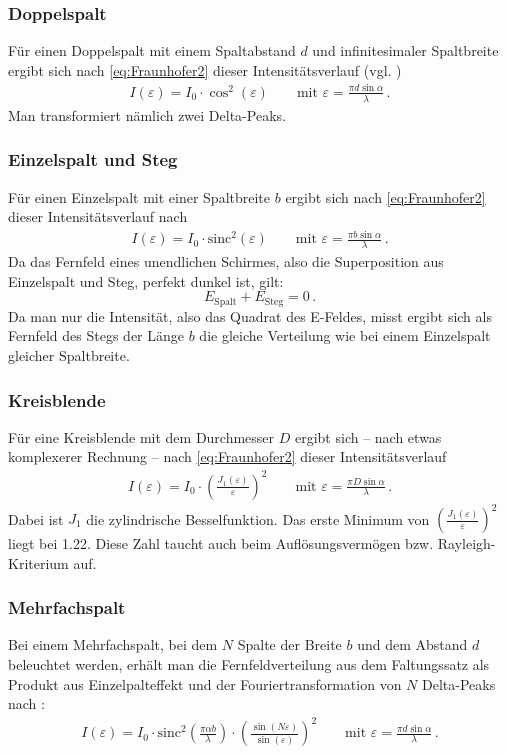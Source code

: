 \documentclass[12pt,a4paper,titlepage,headinclude,bibtotoc]{scrartcl}
\newcommand{\sinc}{\ensuremath{\mathrm{sinc}}}
\begin{document}
\subsubsection{Doppelspalt}
Für einen Doppelspalt mit einem Spaltabstand $d$ und infinitesimaler Spaltbreite ergibt sich nach \eqref{eq:Fraunhofer2} dieser Intensitätsverlauf (vgl. \cite[S.457ff.]{hecht})
\begin{align}
	I(\varepsilon)=I_0 \cdot \cos^2(\varepsilon) \qquad \text{mit }\varepsilon= \frac{\pi d \sin \alpha}{\lambda}\,.
\end{align}
Man transformiert nämlich zwei Delta-Peaks.

\subsubsection{Einzelspalt und Steg}
Für einen Einzelspalt mit einer Spaltbreite $b$ ergibt sich nach \eqref{eq:Fraunhofer2} dieser Intensitätsverlauf nach \cite[S.452]{hecht}
\begin{align}
	I(\varepsilon)=I_0 \cdot \sinc^2(\varepsilon)\qquad \text{mit }\varepsilon= \frac{\pi b \sin \alpha}{\lambda}\,.
\end{align}
Da das Fernfeld eines unendlichen Schirmes, also die Superposition aus Einzelspalt und Steg, perfekt dunkel ist, gilt:
$$ E_\text{Spalt} + E_\text{Steg} = 0 \,.$$
Da man nur die Intensität, also das Quadrat des E-Feldes, misst ergibt sich als Fernfeld des Stegs der Länge $b$ die gleiche Verteilung wie bei einem Einzelspalt gleicher Spaltbreite.

\subsubsection{Kreisblende}
Für eine Kreisblende mit dem Durchmesser $D$ ergibt sich -- nach etwas komplexerer Rechnung \cite[S.467ff.]{hecht} -- nach \eqref{eq:Fraunhofer2} dieser Intensitätsverlauf
\begin{align}
	I(\varepsilon)=I_0 \cdot \left(\frac{J_1(\varepsilon)}{\varepsilon}\right)^2 \qquad \text{mit }\varepsilon= \frac{\pi D \sin \alpha}{\lambda}\,.
\end{align}
Dabei ist $J_1$ die zylindrische Besselfunktion.
Das erste Minimum von $\left(\frac{J_1(\varepsilon)}{\varepsilon}\right)^2$ liegt bei 1.22.
Diese Zahl taucht auch beim Auflösungsvermögen bzw. Rayleigh-Kriterium auf.

\subsubsection{Mehrfachspalt}
Bei einem Mehrfachspalt, bei dem $N$ Spalte der Breite $b$ und dem Abstand $d$ beleuchtet werden, erhält man die Fernfeldverteilung aus dem Faltungssatz als Produkt aus Einzelpalteffekt und der Fouriertransformation von $N$ Delta-Peaks nach \cite[S.460f.]{hecht}:
\begin{align}
	I(\varepsilon)=I_0 \cdot \sinc^2\left(\frac{\pi\alpha b}{\lambda}\right) \cdot \left(\frac{\sin(N\varepsilon)}{\sin(\varepsilon)}\right)^2 \qquad \text{mit }\varepsilon= \frac{\pi d \sin \alpha}{\lambda}\,.
\end{align}
\end{document}
